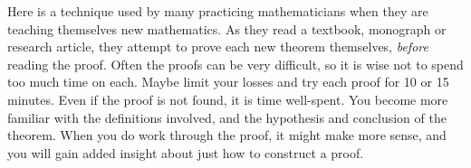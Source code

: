 Here is a technique used by many practicing mathematicians when they are teaching themselves new mathematics.  As they read a textbook, monograph or research article, they attempt to prove each new theorem themselves, {\em before} reading the proof.  Often the proofs can be very difficult, so it is wise not to spend too much time on each.  Maybe limit your losses and try each proof for 10 or 15 minutes.  Even if the proof is not found, it is time well-spent.  You become more familiar with the definitions involved, and the hypothesis and conclusion of the theorem.  When you do work through the proof, it might make more sense, and you will gain added insight about just how to construct a proof.

